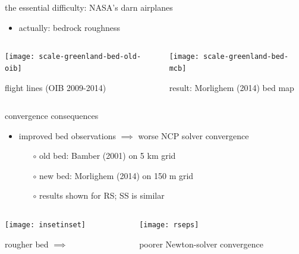 \documentclass[xcolor={dvipsnames}]{beamer}
\begin{document}
\begin{frame}{the essential difficulty: NASA's darn airplanes}

\begin{itemize}
\item actually: \alert{bedrock roughness}
\end{itemize}

\begin{columns}
\begin{column}{0.5\textwidth}
\hspace{10mm} \texttt{[image: scale-greenland-bed-old-oib]}

\footnotesize \hspace{5mm} flight lines (OIB 2009-2014)
\end{column}
\begin{column}{0.6\textwidth}
\vspace{-8mm}

\hspace{10mm} \texttt{[image: scale-greenland-bed-mcb]} 

\footnotesize result: Morlighem (2014) bed map
\end{column}
\end{columns}

\end{frame}



\begin{frame}{convergence consequences}

\begin{itemize}
\item improved bed observations $\implies$ worse NCP solver convergence
  \begin{itemize}
  \item[$\circ$] old bed: Bamber (2001) on 5 km grid
  \item[$\circ$] new bed: Morlighem (2014) on 150 m grid
  \item[$\circ$] results shown for RS; SS is similar
  \end{itemize}
\end{itemize}

\begin{columns}
\begin{column}{0.4\textwidth}
\texttt{[image: insetinset]}

rougher bed \hfill $\implies$ \phantom{sddf}
\end{column}
\begin{column}{0.6\textwidth}
\texttt{[image: rseps]}

poorer Newton-solver convergence
\end{column}
\end{columns}
\end{frame}
\end{document}
